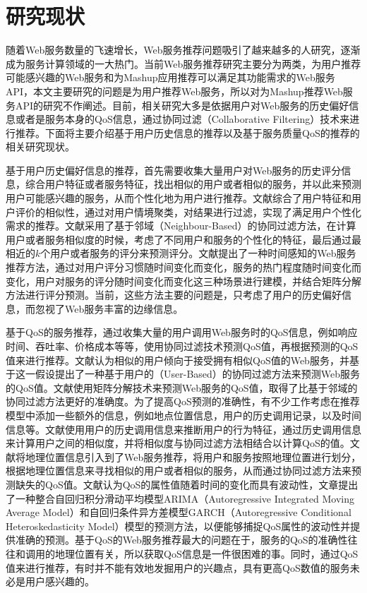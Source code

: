 \documentclass[master,winfonts]{njuthesis}
\begin{document}
\section{研究现状}
随着Web服务数量的飞速增长，Web服务推荐问题吸引了越来越多的人研究，逐渐成为服务计算领域的一大热门。当前Web服务推荐研究主要分为两类，为用户推荐可能感兴趣的Web服务和为Mashup应用推荐可以满足其功能需求的Web服务API，本文主要研究的问题是为用户推荐Web服务，所以对为Mashup推荐Web服务API的研究不作阐述。目前，相关研究大多是依据用户对Web服务的历史偏好信息或者是服务本身的QoS信息，通过协同过滤（Collaborative Filtering）技术来进行推荐。下面将主要介绍基于用户历史信息的推荐以及基于服务质量QoS的推荐的相关研究现状。

基于用户历史偏好信息的推荐，首先需要收集大量用户对Web服务的历史评分信息，综合用户特征或者服务特征，找出相似的用户或者相似的服务，并以此来预测用户可能感兴趣的服务，从而个性化地为用户进行推荐。文献\cite{Ling2014Web}综合了用户特征和用户评价的相似性，通过对用户情境聚类，对结果进行过滤，实现了满足用户个性化需求的推荐。文献\cite{Zheng2009WSRec}\cite{Jiang2011An}采用了基于邻域（Neighbour-Based）的协同过滤方法，在计算用户或者服务相似度的时候，考虑了不同用户和服务的个性化的特征，最后通过最相近的$k$个用户或者服务的评分来预测评分。文献\cite{Tian2014Time}提出了一种时间感知的Web服务推荐方法，通过对用户评分习惯随时间变化而变化，服务的热门程度随时间变化而变化，用户对服务的评分随时间变化而变化这三种场景进行建模，并结合矩阵分解方法进行评分预测。当前，这些方法主要的问题是，只考虑了用户的历史偏好信息，而忽视了Web服务丰富的边缘信息\cite{Shi2014Collaborative}。

基于QoS的服务推荐，通过收集大量的用户调用Web服务时的QoS信息，例如响应时间、吞吐率、价格成本等等\cite{Qi2010Combining}，使用协同过滤技术预测QoS值，再根据预测的QoS值来进行推荐\cite{Zheng2011QoS}。文献\cite{Shao2007Personalized}认为相似的用户倾向于接受拥有相似QoS值的Web服务，并基于这一假设提出了一种基于用户的（User-Based）的协同过滤方法来预测Web服务的QoS值。文献\cite{Zheng2013Collaborative}使用矩阵分解技术来预测Web服务的QoS值，取得了比基于邻域的协同过滤方法更好的准确度。为了提高QoS预测的准确性，有不少工作考虑在推荐模型中添加一些额外的信息，例如地点位置信息，用户的历史调用记录，以及时间信息等。文献\cite{Zhang2011Collaborative}使用用户的历史调用信息来推断用户的行为特征，通过历史调用信息来计算用户之间的相似度，并将相似度与协同过滤方法相结合以计算QoS的值。文献\cite{conf/icws/TangJLL12}将地理位置信息引入到了Web服务推荐，将用户和服务按照地理位置进行划分，根据地理位置信息来寻找相似的用户或者相似的服务，从而通过协同过滤方法来预测缺失的QoS值。文献\cite{Amin2012An}认为QoS的属性值随着时间的变化而具有波动性，文章提出了一种整合自回归积分滑动平均模型ARIMA（Autoregressive Integrated Moving Average Model）和自回归条件异方差模型GARCH（Autoregressive Conditional Heteroskedasticity Model）模型的预测方法，以便能够捕捉QoS属性的波动性并提供准确的预测。基于QoS的Web服务推荐最大的问题在于，服务的QoS的准确性往往和调用的地理位置有关，所以获取QoS信息是一件很困难的事。同时，通过QoS值来进行推荐，有时并不能有效地发掘用户的兴趣点，具有更高QoS数值的服务未必是用户感兴趣的。
\end{document}
